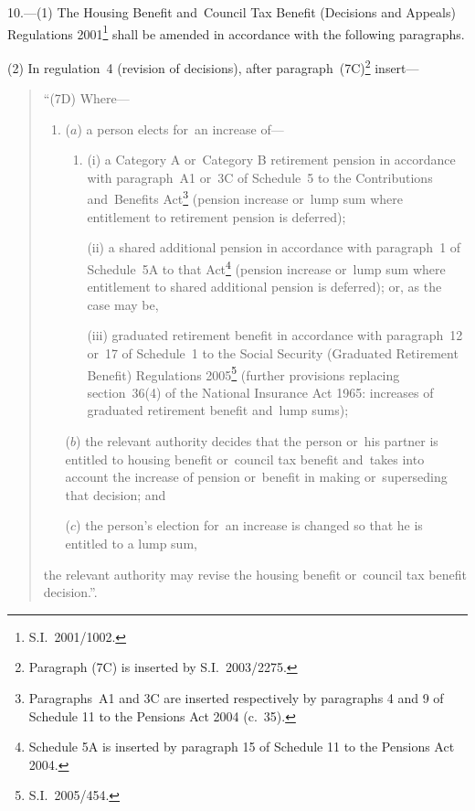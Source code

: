 \documentclass[12pt,a4paper]{article}
\begin{document}
10.---(1)  The Housing Benefit and~Council Tax Benefit (Decisions and Appeals) Regulations 2001\footnote{S.I.~2001/1002.} shall be amended in accordance with the following paragraphs.

(2) In regulation~4 (revision of decisions), after paragraph~(7C)\footnote{Paragraph (7C) is inserted by S.I.~2003/2275.} insert—
\begin{quotation}
“(7D) Where—
\begin{enumerate}\item[]
($a$) a person elects for~an increase of—
\begin{enumerate}\item[]
(i) a Category A or~Category B retirement pension in accordance with paragraph~A1 or~3C of Schedule~5 to the Contributions and~Benefits Act\footnote{Paragraphs~A1 and 3C are inserted respectively by paragraphs 4 and 9 of Schedule 11 to the Pensions Act 2004 (c.~35).} (pension increase or~lump sum where entitlement to retirement pension is deferred);

(ii) a shared additional pension in accordance with paragraph~1 of Schedule~5A to that Act\footnote{Schedule 5A is inserted by paragraph 15 of Schedule 11 to the Pensions Act 2004.} (pension increase or~lump sum where entitlement to shared additional pension is deferred); or, as the case may be,

\pagebreak[3]

(iii) graduated retirement benefit in accordance with paragraph~12 or~17 of Schedule~1 to the Social Security (Graduated Retirement Benefit) Regulations 2005\footnote{S.I.~2005/454.} (further provisions replacing section~36(4) of the National Insurance Act 1965: increases of graduated retirement benefit and~lump sums);
\end{enumerate}

($b$) the relevant authority decides that the person or~his partner is entitled to housing benefit or~council tax benefit and~takes into account the increase of pension or~benefit in making or~superseding that decision; and

($c$) the person’s election for~an increase is changed so that he is entitled to a lump sum,
\end{enumerate}
the relevant authority may revise the housing benefit or~council tax benefit decision.”.
\end{quotation}
\end{document}

